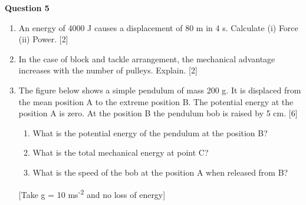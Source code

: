 \noindent
\textbf{Question 5}
\begin{enumerate}[label=(\roman*)]

    \item An energy of 4000 J causes a displacement of 80 m in 4 s. 
        Calculate (i) Force (ii) Power. \hfill [2]

    \item In the case of block and tackle arrangement, the mechanical 
        advantage increases with the number of pulleys. Explain. \hfill [2]

    \item The figure below shows a simple pendulum of mass 200 g. It is 
        displaced from the mean position A to the extreme position B. 
        The potential energy at the position A is zero. At the position 
        B the pendulum bob is raised by 5 cm. \hfill [6]


        \begin{enumerate}[label=(\alph*)]
            \item What is the potential energy of the pendulum at the 
                position B?
            \item What is the total mechanical energy at point C?
            \item What is the speed of the bob at the position A when 
                released from B?
        \end{enumerate}
        [Take g = 10 ms\textsuperscript{-2} and no loss of energy]


\end{enumerate}

